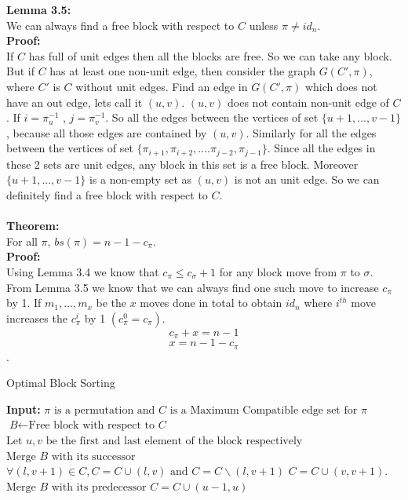 \documentclass[BTech]{iitmdiss}
\begin{document}
\noindent
\textbf{Lemma 3.5:}\\
We can always find a free block with respect to $C$ unless $\pi \neq id_n$.\\
\textbf{Proof:}\\
If $C$ has full of unit edges then all the blocks are free. So we can take any block. But if $C$ has at least one non-unit edge, then consider the graph $G(C',\pi)$, where $C'$ is $C$ without unit edges. Find an edge in $G(C',\pi)$ which does not have an out edge, lets call it $(u,v)$. $(u,v)$ does not contain non-unit edge of $C$. If $i = \pi^{-1}_u$ , $j = \pi^{-1}_v$. So all the edges between the vertices of set $\{u+1,...,v-1\}$, because all those edges are contained by $(u,v)$. Similarly for all the edges between the vertices of set $\{\pi_{i+1},\pi_{i+2},....\pi_{j-2},\pi_{j-1}\}$. Since all the edges in these 2 sets are unit edges, any block in this set is a free block. Moreover $\{u+1,...,v-1\}$ is a non-empty set as $(u,v)$ is not an unit edge. So we can definitely find a free block with respect to $C$.\\~\\
\textbf{Theorem:}\\
For all $\pi$, $bs(\pi) = n-1-c_{\pi}$.\\
\textbf{Proof:}\\
Using Lemma 3.4 we know that $c_\pi \leq c_\sigma + 1$ for any block move from $\pi$ to $\sigma$. From Lemma 3.5 we know that we can always find one such move to increase $c_{\pi}$ by 1. If $m_1,...,m_x$ be the $x$ moves done in total to obtain $id_n$ where $i^{th}$ move increases the $c^i_{\pi}$ by 1 $(c^0_{\pi} = c_{\pi})$.  $$c_{\pi} + x = n-1$$ $$x = n-1-c_{\pi}$$. 


\begin{algorithm}
\caption{Optimal Block Sorting}\label{euclid}
\begin{algorithmic}[1]
\State \textbf{Input: } $\pi \text{ is a permutation and }\textit{C} \text{ is a Maximum Compatible edge set for } \pi$ 
\State $\textit{B} \gets \text{Free block with respect to }\textit{C}$
\State $\text{Let } u,v \text{ be the first and last element of the block respectively}$
\State $\text{Merge } \textit{B} \text{ with its successor}$
\State $\forall (l,v+1) \in C, C = C\cup(l,v) \text{ and } C=C\backslash(l,v+1) $
\State $C = C\cup(v,v+1)$.
\Else
\State $\text{Merge } \textit{B} \text{ with its predecessor}$
\State $C = C\cup(u-1,u)$
\EndIf
\EndWhile
\EndProcedure
\end{algorithmic}
\end{algorithm}
\citep{mahajan2006approximate}
\citep{bafna1996genome}
\cite{mahajan2008block}
\cite{narayanaswamy2015block}
\end{document}
